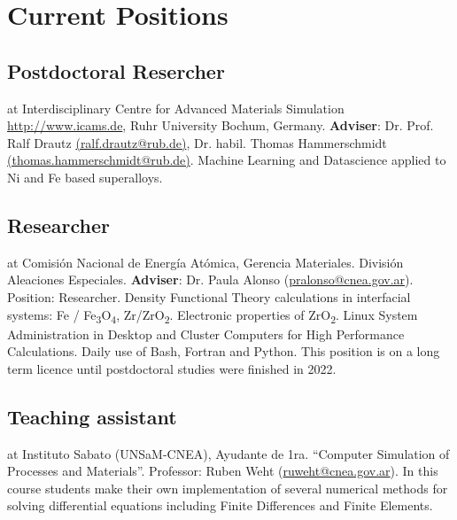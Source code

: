 \section{Current Positions}

\subsection{Postdoctoral Resercher} at Interdisciplinary Centre for Advanced Materials Simulation
\href{(ICAMS)}{http://www.icams.de}, Ruhr University Bochum, Germany.
\textbf{Adviser}: Dr. Prof. Ralf Drautz \href{mailto:ralf.drautz@rub.de}{(ralf.drautz@rub.de)}, 
Dr. habil. Thomas Hammerschmidt \href{mailto:thomas.hammerschmidt@rub.de}{(thomas.hammerschmidt@rub.de)}. 
Machine Learning and Datascience applied to Ni and Fe based superalloys. 

\subsection{ Researcher} at Comisión Nacional de Energía Atómica,  Gerencia
Materiales. División Aleaciones Especiales. \textbf{Adviser}: Dr. Paula Alonso
(\url{pralonso@cnea.gov.ar}). Position: Researcher. Density Functional Theory
calculations in interfacial systems: Fe /
Fe\textsubscript{3}O\textsubscript{4}, Zr/ZrO\textsubscript{2}. Electronic properties
of ZrO\textsubscript{2}. Linux System Administration in Desktop and Cluster
Computers for High Performance Calculations. Daily use of Bash, Fortran and
Python. This position is on a long term licence until postdoctoral studies were
finished in 2022.

\subsection{Teaching assistant} at Instituto Sabato (UNSaM-CNEA), Ayudante de
1ra. “Computer Simulation of Processes and Materials”. Professor: Ruben Weht
(\url{ruweht@cnea.gov.ar}). In this course students make their own
implementation of several numerical methods for solving differential equations
including Finite Differences and Finite Elements.
